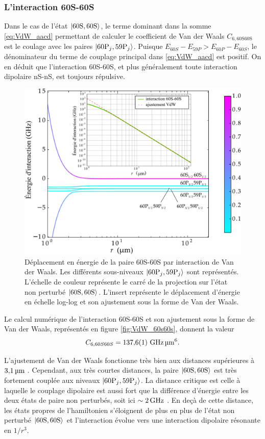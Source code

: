 \subsubsection*{L'interaction 60S-60S}
Dans le cas de l'état $\ket{60\text{S},60\text{S}}$, le terme dominant dans la somme \eqref{eq:VdW_aacd} permettant de calculer le coefficient de Van der Waals $C_{6,\text{60S60S}}$ est le coulage avec les paires $\ket{60\text{P}_j,59\text{P}_j}$.
Puisque $E_{60S}-E_{59P}>E_{60P}-E_{60S}$, le dénominateur du terme de couplage principal dans \eqref{eq:VdW_aacd} est positif.
On en déduit que l'interaction 60S-60S, et plus généralement toute interaction dipolaire nS-nS, est toujours répulsive.
%
\begin{figure}[!h]
\centering
\includegraphics[width=0.8\linewidth]{figures/VdW_60S60S}
\caption[Interaction dipolaire 60S-60S]{Déplacement en énergie de la paire 60S-60S par interaction de Van der Waals. Les différents sous-niveaux $\ket{60\text{P}_j,59\text{P}_j}$ sont représentés. L'échelle de couleur représente le carré de la projection sur l'état non perturbé $\ket{60\text{S},60\text{S}}$.
L'insert représente le déplacement d'énergie en échelle log-log et son ajustement sous la forme de Van der Waals.}
\label{fig:VdW_60s60s}
\end{figure}
%
Le calcul numérique de l'interaction 60S-60S et son ajustement sous la forme de Van der Waals, représentés en figure \eqref{fig:VdW_60s60s}, donnent la valeur
\begin{equation}
\label{eq:C660S}
C_{6,60S60S} = \numv{137.6(1)}\si{\giga\hertz\raiseto{6}\micro\meter}.
\end{equation}

L'ajustement de Van der Waals fonctionne très bien aux distances supérieures à $\SIv{3.1}{ \micro\meter}$.
Cependant, aux très courtes distances, la paire $\ket{60\text{S},60\text{S}}$ est très fortement couplée aux niveaux $\ket{60\text{P}_j,59\text{P}_j}$.
La distance critique est celle à laquelle le couplage dipolaire est aussi fort que la différence d'énergie entre les deux états de paire non perturbés, soit ici $\sim \SIv{2}{\giga\hertz}$.
En deçà de cette distance, les états propres de l'hamiltonien s'éloignent de plus en plus de l'état non perturbé $\ket{60\text{S},60\text{S}}$ et l'interaction évolue vers une interaction dipolaire résonante en $1/r^3$.

